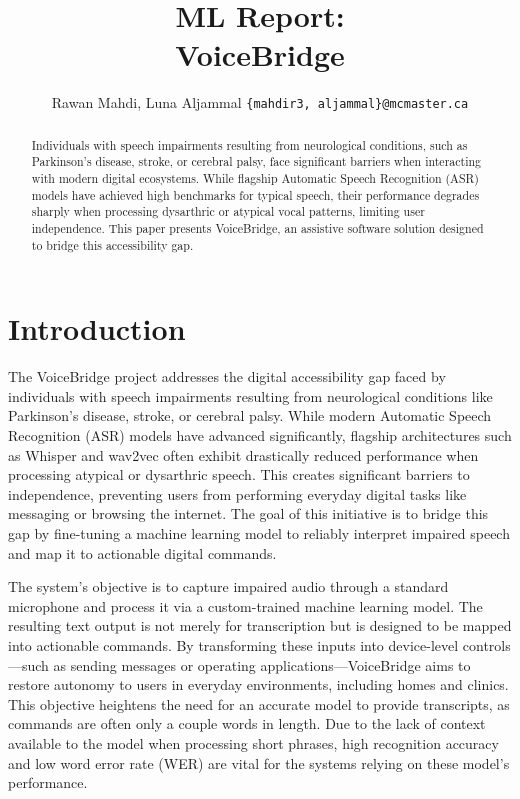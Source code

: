 \documentclass[11pt]{article}
\title{ML Report:\\ VoiceBridge}
\author{Rawan Mahdi, Luna Aljammal \texttt{\{mahdir3, aljammal\}@mcmaster.ca}}
\begin{document}
\maketitle
\begin{abstract}
Individuals with speech impairments resulting from neurological conditions, such as Parkinson’s disease, stroke, or cerebral palsy, face significant barriers when interacting with modern digital ecosystems. While flagship Automatic Speech Recognition (ASR) models have achieved high benchmarks for typical speech, their performance degrades sharply when processing dysarthric or atypical vocal patterns, limiting user independence. This paper presents VoiceBridge, an assistive software solution designed to bridge this accessibility gap.
\end{abstract}


\section{Introduction}

The VoiceBridge project addresses the digital accessibility gap faced by individuals with speech impairments resulting from neurological conditions like Parkinson’s disease, stroke, or cerebral palsy. While modern Automatic Speech Recognition (ASR) models have advanced significantly, flagship architectures such as Whisper and wav2vec often exhibit drastically reduced performance when processing atypical or dysarthric speech. This creates significant barriers to independence, preventing users from performing everyday digital tasks like messaging or browsing the internet. The goal of this initiative is to bridge this gap by fine-tuning a machine learning model to reliably interpret impaired speech and map it to actionable digital commands.

The system's objective is to capture impaired audio through a standard microphone and process it via a custom-trained machine learning model. The resulting text output is not merely for transcription but is designed to be mapped into actionable commands. By transforming these inputs into device-level controls—such as sending messages or operating applications—VoiceBridge aims to restore autonomy to users in everyday environments, including homes and clinics. This objective heightens the need for an accurate model to provide transcripts, as commands are often only a couple words in length. Due to the lack of context available to the model when processing short phrases, high recognition accuracy and low word error rate (WER) are vital for the systems relying on these model's performance.
\end{document}
